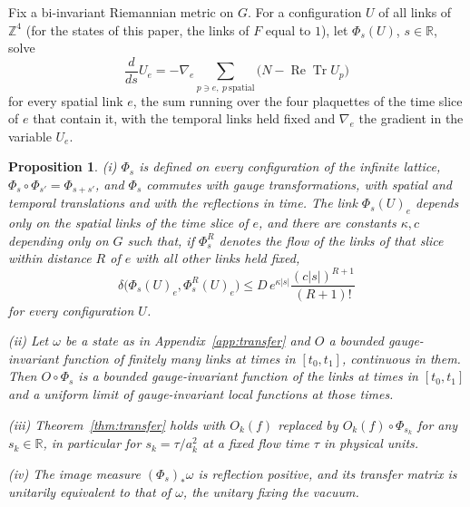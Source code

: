 \documentclass[aps,prd,twocolumn,superscriptaddress,nofootinbib,longbibliography,floatfix,amsmath,amssymb,10pt]{revtex4-2}
\newtheorem{proposition}[theorem]{Proposition}
\theoremstyle{definition}
\theoremstyle{remark}
\newcommand{\R}{\mathbb{R}}
\newcommand{\Z}{\mathbb{Z}}
\newcommand{\ReTr}{\operatorname{Re}\operatorname{Tr}}
\begin{document}
Fix a bi-invariant Riemannian metric on $G$. For a configuration $U$ of all
links of $\Z^4$ (for the states of this paper, the links of $F$ equal to
$1$), let $\Phi_s(U)$, $s\in\R$, solve
\[
\frac{d}{ds}U_e=-\nabla_e\!\!\sum_{p\ni e,\ p\ \mathrm{spatial}}
\bigl(N-\ReTr U_p\bigr)
\]
for every spatial link $e$, the sum running over the four plaquettes of the
time slice of $e$ that contain it, with the temporal links held fixed and
$\nabla_e$ the gradient in the variable $U_e$.

\begin{proposition}\label{prop:spatialflow}
\textup{(i)} $\Phi_s$ is defined on every configuration of the infinite
lattice, $\Phi_s\circ\Phi_{s'}=\Phi_{s+s'}$, and $\Phi_s$ commutes with gauge
transformations, with spatial and temporal translations and with the
reflections in time. The link $\Phi_s(U)_e$ depends only on the spatial links
of the time slice of $e$, and there are constants $\kappa,c$ depending only on
$G$ such that, if $\Phi^{R}_s$ denotes the flow of the links of that slice
within distance $R$ of $e$ with all other links held fixed,
\[
\delta\bigl(\Phi_s(U)_e,\Phi^R_s(U)_e\bigr)\le D\,e^{\kappa|s|}
\frac{(c|s|)^{R+1}}{(R+1)!}
\]
for every configuration $U$.

\textup{(ii)} Let $\omega$ be a state as in Appendix~\ref{app:transfer} and
$O$ a bounded gauge-invariant function of finitely many links at times in
$[t_0,t_1]$, continuous in them. Then $O\circ\Phi_s$ is a bounded
gauge-invariant function of the links at times in $[t_0,t_1]$ and a uniform
limit of gauge-invariant local functions at those times.

\textup{(iii)} Theorem~\ref{thm:transfer} holds with $O_k(f)$ replaced by
$O_k(f)\circ\Phi_{s_k}$ for any $s_k\in\R$, in particular for $s_k=\tau/a_k^2$
at a fixed flow time $\tau$ in physical units.

\textup{(iv)} The image measure $(\Phi_s)_*\omega$ is reflection positive, and
its transfer matrix is unitarily equivalent to that of $\omega$, the unitary
fixing the vacuum.
\end{proposition}
\end{document}
